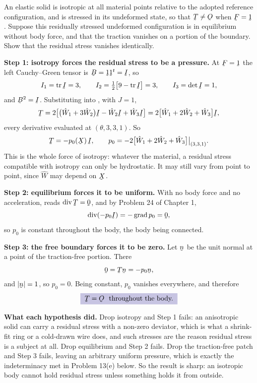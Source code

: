 \begin{problem}
An elastic solid is isotropic at all material points relative to the
adopted reference configuration, and is stressed in its undeformed
state, so that $\bT\neq\Ob$ when $\bF=\shift$. Suppose this residually
stressed undeformed configuration is in equilibrium without body force,
and that the traction vanishes on a portion of the boundary. Show that
the residual stress vanishes identically.
\end{problem}

\begin{solution}
\textbf{Step 1: isotropy forces the residual stress to be a pressure.}
At $\bF=\shift$ the left Cauchy--Green tensor is
$\bB=\shift\shift^{t}=\I$, so
\[
   I_{1}=\tr\I=3,\qquad I_{2}=\tfrac12\big[9-\tr\I\big]=3,
   \qquad I_{3}=\det\I=1 ,
\]
and $\bB^{2}=\I$. Substituting into , with $J=1$,
\[
   \bT=2\big[\big(\hat W_{1}+3\hat W_{2}\big)\I
   -\hat W_{2}\I+\hat W_{3}\I\big]
   =2\big[\hat W_{1}+2\hat W_{2}+\hat W_{3}\big]\I ,
\]
every derivative evaluated at $(\theta,3,3,1)$. So
\[
   \bT=-p_{0}(\bX)\,\I,\qquad
   p_{0}=-2\big[\hat W_{1}+2\hat W_{2}+\hat W_{3}\big]\big|_{(3,3,1)} .
\]
This is the whole force of isotropy: whatever the material, a residual
stress compatible with isotropy can only be hydrostatic. It may still
vary from point to point, since $\hat W$ may depend on $\bX$.

\textbf{Step 2: equilibrium forces it to be uniform.} With no body force
and no acceleration,  reads $\dvg\bT=\bze$, and by Problem 24
of Chapter 1,
\[
   \dvg(-p_{0}\I)=-\grad p_{0}=\bze ,
\]
so $p_{0}$ is constant throughout the body, the body being connected.

\textbf{Step 3: the free boundary forces it to be zero.} Let $\bn$ be
the unit normal at a point of the traction-free portion. There
\[
   \bze=\bT\bn=-p_{0}\bn ,
\]
and $|\bn|=1$, so $p_{0}=0$. Being constant, $p_{0}$ vanishes
everywhere, and therefore
\[
   \boxed{\;\bT=\Ob\ \text{ throughout the body.}\;}
\]

\textbf{What each hypothesis did.} Drop isotropy and Step 1 fails: an
anisotropic solid can carry a residual stress with a non-zero deviator,
which is what a shrink-fit ring or a cold-drawn wire does, and such
stresses are the reason residual stress is a subject at all. Drop
equilibrium and Step 2 fails. Drop the traction-free patch and Step 3
fails, leaving an arbitrary uniform pressure, which is exactly the
indeterminacy met in Problem 13(e) below. So the result is sharp: an
isotropic body cannot hold residual stress unless something holds it
from outside.
\end{solution}

